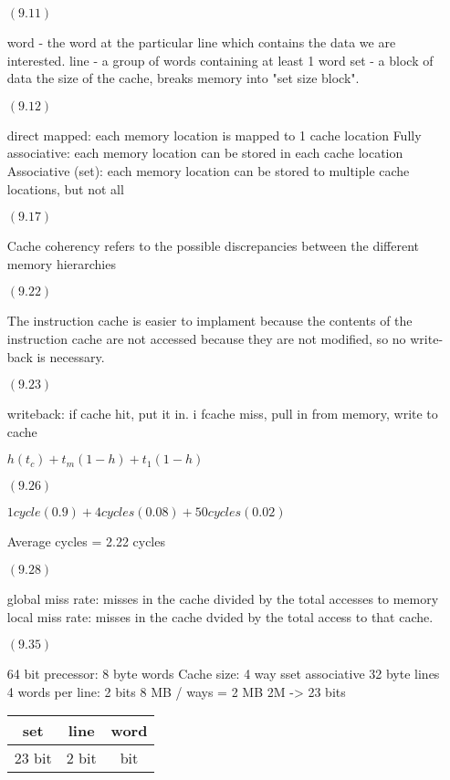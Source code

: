 \documentclass[letterpaper,10pt,titlepage]{article}
\begin{document}
\begin{enumerate}
\item[$(9.11)$]

word - the word at the particular line which contains the data we are interested.
line - a group of words containing at least 1 word
set - a block of data the size of the cache, breaks memory into "set size block".

\item[$(9.12)$]

direct mapped: each memory location is mapped to 1 cache location
Fully associative: each memory location can be stored in each cache location
Associative (set): each memory location can be stored to multiple cache locations, but not all

\item[$(9.17)$]

Cache coherency refers to the possible discrepancies between the different memory hierarchies

\item[$(9.22)$]

The instruction cache is easier to implament because the contents of the instruction cache are not accessed because they are not modified, so no write-back is necessary. 

\item[$(9.23)$]

writeback: if cache hit, put it in. i fcache miss, pull in from memory, write to cache

$h(t_{c}) + t_{m}(1-h) + t_{1}(1-h)$

\item[$(9.26)$]

$1 cycle(0.9) + 4 cycles(0.08) + 50 cycles(0.02)$

Average cycles = 2.22 cycles 


\item[$(9.28)$]

global miss rate: misses in the cache divided by the total accesses to memory
local miss rate: misses in the cache dvided by the total access to that cache.

\item[$(9.35)$]

64 bit precessor: 8 byte words
Cache size: 4 way sset associative
32 byte lines
4 words per line: 2 bits
8 MB / ways = 2 MB
2M -> 23 bits
\begin{tabular}{| c | c | c |}
    set & line & word \\ \hline
    23 bit & 2 bit &  bit \\ \hline
\end{tabular}




\end{enumerate}
\end{document}
